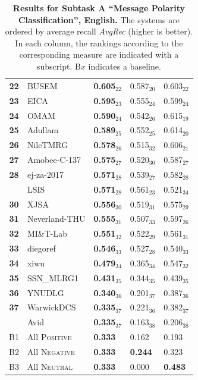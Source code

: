 \begin{table}[h!]
\begin{small}
\begin{tabular}{|c|l|l|l|l|}
\bf 22 & BUSEM & \bf 0.605$_{22}$ & 0.587$_{20}$ & 0.603$_{22}$ \\
\bf 23 & EICA & \bf 0.595$_{23}$ & 0.555$_{24}$ & 0.599$_{24}$ \\
\bf 24 & OMAM & \bf 0.590$_{24}$ & 0.542$_{26}$ & 0.615$_{19}$ \\
\bf 25 & Adullam & \bf 0.589$_{25}$ & 0.552$_{25}$ & 0.614$_{20}$ \\
\bf 26 & NileTMRG & \bf 0.578$_{26}$ & 0.515$_{32}$ & 0.606$_{21}$ \\
\bf 27 & Amobee-C-137 & \bf 0.575$_{27}$ & 0.520$_{30}$ & 0.587$_{27}$ \\
\bf 28 & ej-za-2017 & \bf 0.571$_{28}$ & 0.539$_{27}$ & 0.582$_{28}$ \\
& LSIS & \bf 0.571$_{28}$ & 0.561$_{23}$ & 0.521$_{34}$ \\
\bf 30 & XJSA & \bf 0.556$_{30}$ & 0.519$_{31}$ & 0.575$_{29}$ \\
\bf 31 & Neverland-THU & \bf 0.555$_{31}$ & 0.507$_{33}$ & 0.597$_{26}$ \\
\bf 32 & MI\&T-Lab & \bf 0.551$_{32}$ & 0.522$_{29}$ & 0.561$_{31}$ \\
\bf 33 & diegoref & \bf 0.546$_{33}$ & 0.527$_{28}$ & 0.540$_{33}$ \\
\bf 34 & xiwu & \bf 0.479$_{34}$ & 0.365$_{34}$ & 0.547$_{32}$ \\
\bf 35 & SSN\_MLRG1 & \bf 0.431$_{35}$ & 0.344$_{35}$ & 0.439$_{35}$ \\
\bf 36 & YNUDLG & \bf 0.340$_{36}$ & 0.201$_{37}$ & 0.387$_{36}$ \\
\bf 37 & WarwickDCS & \bf 0.335$_{37}$ & 0.221$_{36}$ & 0.382$_{37}$ \\
& Avid & \bf 0.335$_{37}$ & 0.163$_{38}$ & 0.206$_{38}$ \\
\hline
B1 & All \textsc{Positive} & \bf 0.333 & 0.162 & 0.193\\
B2 & All \textsc{Negative} & \bf 0.333 & \bf 0.244 & 0.323\\
B3 & All \textsc{Neutral}  & \bf 0.333 & 0.000 & \bf 0.483\\
\hline
\end{tabular}
\caption{\textbf{Results for Subtask A ``Message Polarity Classification'', English.} 
The systems are ordered by average recall \emph{AvgRec} (higher is better). In each column, the rankings according to the corresponding measure are indicated with a subscript. B$x$ indicates a baseline.}
\label{table:ResultsSubtaskA:English}
\end{small}
\end{table}
